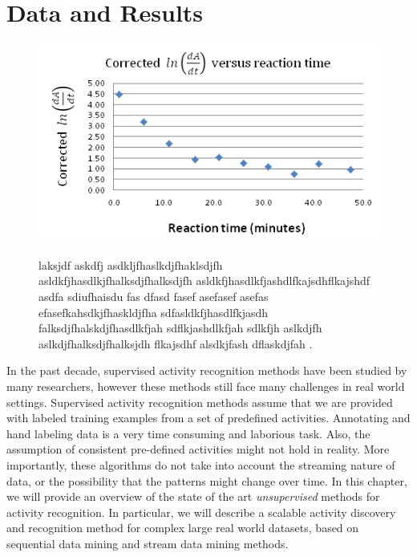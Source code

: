 \section{Data and Results}

\begin{figure}[h]
  \includegraphics[scale=0.5]{./Figures/20M_dipic_readings.png}\\
  \caption{laksjdf askdfj asdkljfhaslkdjfhaklsdjfh asldkfjhasdlkjfhalksdjfhalksdjfh asldkfjhasdlkfjashdlfkajsdhflkajshdf asdfa sdiufhaisdu fas dfasd fasef asefasef asefas efasefkahsdkjfhaskldjfha sdfasldkfjhasdlfkjasdh falksdjfhalskdjfhasdlkfjah sdflkjashdlkfjah sdlkfjh aslkdjfh aslkdjfhalksdjfhalksjdh flkajsdhf alsdkjfash dflaskdjfah .}\label{fig:0.20M_dipic_readings}
\end{figure}

In the past decade, supervised activity recognition methods have been studied by many researchers, however these methods still face many challenges in real world settings. Supervised activity recognition methods assume that we are provided with labeled training examples from a set of predefined activities. Annotating and hand labeling data is a very time consuming and laborious task. Also, the assumption of consistent pre-defined activities might not hold in reality. More importantly, these algorithms do not take into account the streaming nature of data, or the possibility that the patterns might change over time. In this chapter, we will provide an overview of the state of the art \emph{unsupervised} methods for activity recognition. In particular, we will describe a scalable activity discovery and recognition method for complex large real world datasets, based on sequential data mining and stream data mining methods.

